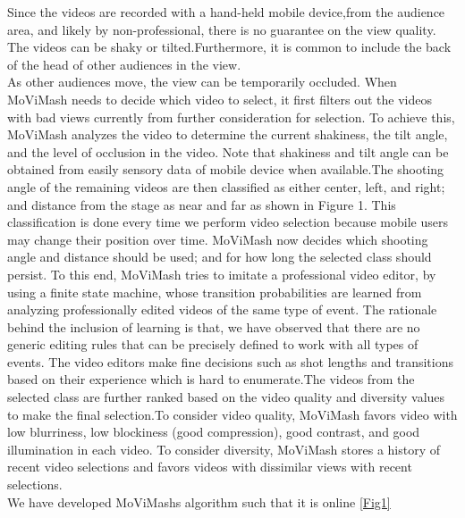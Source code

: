 \documentclass{sig-alternate}
\begin{document}
Since the videos are recorded with a hand-held mobile device,from the audience area, and likely by non-professional, there is no guarantee on the view quality. The videos can be shaky or tilted.Furthermore, it is common to include the back of the head of other
audiences in the view.\\
\qquad As other audiences move, the view can be temporarily occluded. When MoViMash needs to decide which video to select, it first filters out the videos with bad views currently from further consideration for selection. To achieve this, MoViMash analyzes the video to determine the current shakiness, the tilt angle, and the level of occlusion in the video. Note that shakiness and tilt angle can be obtained from easily sensory data of mobile
device when available.The shooting angle of the remaining videos are then classified as
either center, left, and right; and distance from the stage as near and far as shown in Figure 1. This classification is done every time we perform video selection because mobile users may change their position over time. MoViMash now decides which shooting angle and distance should be used; and for how long the selected class should persist. To this end, MoViMash tries to imitate a professional video editor, by using a finite state machine, whose transition probabilities are learned from analyzing professionally edited videos of the same type of event. The rationale behind the inclusion of learning is that, we have observed that there are no generic editing rules that can be precisely defined to work with all types of events. The
video editors make fine decisions such as shot lengths and transitions based on their experience which is hard to enumerate.The videos from the selected class are further ranked based on the video quality and diversity values to make the final selection.To consider video quality, MoViMash favors video with low blurriness, low blockiness (good compression), good contrast, and good illumination in each video. To consider diversity, MoViMash stores a history of recent video selections and favors videos with dissimilar views with recent selections.\\
\qquad We have developed MoViMash\textquotesingle s algorithm such that it is online \ref{Fig1}
\end{document}
